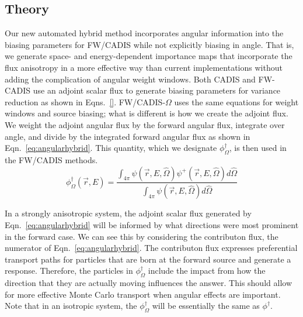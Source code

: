 \documentclass[12pt]{article}
\begin{document}
%
\subsection{Theory}
\label{subsect::theory}

Our new automated hybrid method incorporates angular information into the biasing parameters for FW/CADIS while not explicitly biasing in angle. 
That is, we generate space- and energy-dependent importance maps that incorporate the flux anisotropy in a more effective way than current implementations without adding the complication of angular weight windows. 
Both CADIS and FW-CADIS use an adjoint scalar flux to generate biasing parameters for variance reduction as shown in Eqns.~\eqref{}. 
FW/CADIS-$\Omega$ uses the same equations for weight windows and source biasing; what is different is how we create the adjoint flux. 
We weight the adjoint angular flux by the forward angular flux, integrate over angle, and divide by the integrated forward angular flux as shown in Eqn.~\eqref{eq:angularhybrid}.
This quantity, which we designate $\phi^{\dagger}_{\Omega}$, is then used in the FW/CADIS methods.
%
\begin{equation} 
\phi^{\dagger}_{\Omega}(\vec{r},E) = \frac{\int_{4\pi} \psi(\vec {r} ,E,\hat{\Omega})\psi^+(\vec {r} ,E,\hat{\Omega})d\hat\Omega }{\int_{4\pi}\psi(\vec {r} ,E,\hat{\Omega})d\hat\Omega}
\label{eq:angularhybrid}
\end{equation}

In a strongly anisotropic system, the adjoint scalar flux generated by Eqn.~\eqref{eq:angularhybrid} will be informed by what directions were most prominent in the forward case. 
We can see this by considering the contributon flux, the numerator of Eqn.~\eqref{eq:angularhybrid}.
The contributon flux expresses preferential transport paths for particles that are born at the forward source and generate a response.
Therefore, the particles in $\phi^{\dagger}_{\Omega}$ include the impact from how the direction that they are actually moving influences the answer. 
This should allow for more effective Monte Carlo transport when angular effects are important. 
Note that in an isotropic system, the $\phi^{\dagger}_{\Omega}$ will be essentially the same as $\phi^{\dagger}$. 

\end{document}
